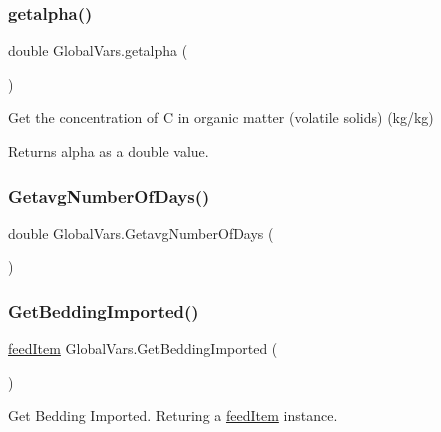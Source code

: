 \subsubsection{\texorpdfstring{getalpha()}{getalpha()}}
{\footnotesize\ttfamily double Global\+Vars.\+getalpha (\begin{DoxyParamCaption}{ }\end{DoxyParamCaption})\hspace{0.3cm}{\ttfamily [inline]}}



Get the concentration of C in organic matter (volatile solids) (kg/kg) 

\begin{DoxyReturn}{Returns}
alpha as a double value. 
\end{DoxyReturn}
\mbox{\label{class_global_vars_a1d152c67721fc4d265fd737adcbac6db}} 
\subsubsection{\texorpdfstring{GetavgNumberOfDays()}{GetavgNumberOfDays()}}
{\footnotesize\ttfamily double Global\+Vars.\+Getavg\+Number\+Of\+Days (\begin{DoxyParamCaption}{ }\end{DoxyParamCaption})\hspace{0.3cm}{\ttfamily [inline]}}

\mbox{\label{class_global_vars_a092e7eeb7bece400396938d44551a9f5}} 
\subsubsection{\texorpdfstring{GetBeddingImported()}{GetBeddingImported()}}
{\footnotesize\ttfamily \mbox{\hyperlink{classfeed_item}{feed\+Item}} Global\+Vars.\+Get\+Bedding\+Imported (\begin{DoxyParamCaption}{ }\end{DoxyParamCaption})\hspace{0.3cm}{\ttfamily [inline]}}



Get Bedding Imported. Returing a \mbox{\hyperlink{classfeed_item}{feed\+Item}} instance. 

